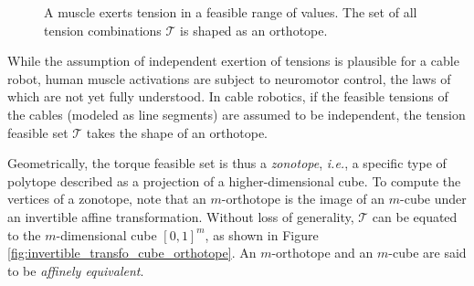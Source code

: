 \begin{figure}[!htb]
\begin{minipage}{0.59\linewidth}
    \caption{A muscle exerts tension in a feasible range of values. The set of all tension combinations $\mathcal{T}$ is shaped as an orthotope.}
    \label{fig:tension_set_orthotope}
  \end{minipage}
\end{figure}

While the assumption of independent exertion of tensions is plausible for a cable robot, human muscle activations are subject to neuromotor control, the laws of which are not yet fully understood. In cable robotics, if the feasible tensions of the cables (modeled as line segments) are assumed to be independent, the tension feasible set $\mathcal{T}$ takes the shape of an orthotope.

Geometrically, the torque feasible set is thus a \emph{zonotope}, \emph{i.e.}, a specific type of polytope described as a projection of a higher-dimensional cube. To compute the vertices of a zonotope, note that an $m$-orthotope is the image of an $m$-cube under an invertible affine transformation. Without loss of generality, $\mathcal{T}$ can be equated to the $m$-dimensional cube $[0,1]^m$, as shown in Figure \ref{fig:invertible_transfo_cube_orthotope}. An $m$-orthotope and an $m$-cube are said to be \emph{affinely equivalent}. 
